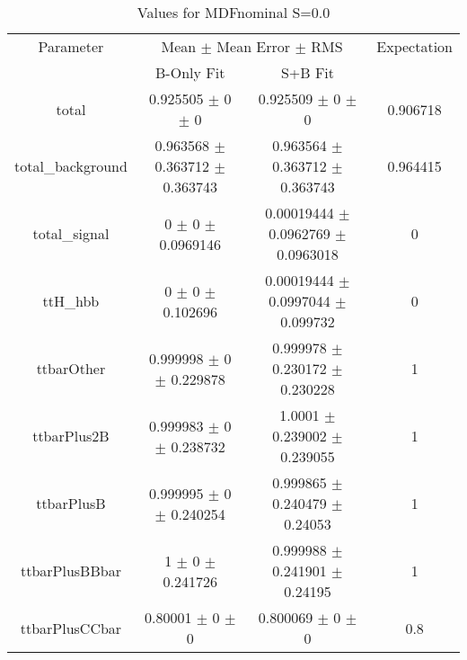 \begin{table}
\centering
\caption{Values for MDFnominal S=0.0}
\begin{tabular}{cccc}
\toprule
Parameter & \multicolumn{2}{c}{Mean $\pm$ Mean Error $\pm$ RMS} & Expectation\\
 & B-Only Fit & S+B Fit & \\
\midrule
total & \num{0.925505} $\pm$ \num{0} $\pm$ \num{0} & \num{0.925509} $\pm$ \num{0} $\pm$ \num{0} & \num{0.906718}\\
total\_background & \num{0.963568} $\pm$ \num{0.363712} $\pm$ \num{0.363743} & \num{0.963564} $\pm$ \num{0.363712} $\pm$ \num{0.363743} & \num{0.964415}\\
total\_signal & \num{0} $\pm$ \num{0} $\pm$ \num{0.0969146} & \num{0.00019444} $\pm$ \num{0.0962769} $\pm$ \num{0.0963018} & \num{0}\\
ttH\_hbb & \num{0} $\pm$ \num{0} $\pm$ \num{0.102696} & \num{0.00019444} $\pm$ \num{0.0997044} $\pm$ \num{0.099732} & \num{0}\\
ttbarOther & \num{0.999998} $\pm$ \num{0} $\pm$ \num{0.229878} & \num{0.999978} $\pm$ \num{0.230172} $\pm$ \num{0.230228} & \num{1}\\
ttbarPlus2B & \num{0.999983} $\pm$ \num{0} $\pm$ \num{0.238732} & \num{1.0001} $\pm$ \num{0.239002} $\pm$ \num{0.239055} & \num{1}\\
ttbarPlusB & \num{0.999995} $\pm$ \num{0} $\pm$ \num{0.240254} & \num{0.999865} $\pm$ \num{0.240479} $\pm$ \num{0.24053} & \num{1}\\
ttbarPlusBBbar & \num{1} $\pm$ \num{0} $\pm$ \num{0.241726} & \num{0.999988} $\pm$ \num{0.241901} $\pm$ \num{0.24195} & \num{1}\\
ttbarPlusCCbar & \num{0.80001} $\pm$ \num{0} $\pm$ \num{0} & \num{0.800069} $\pm$ \num{0} $\pm$ \num{0} & \num{0.8}\\
\bottomrule
\end{tabular}
\end{table}